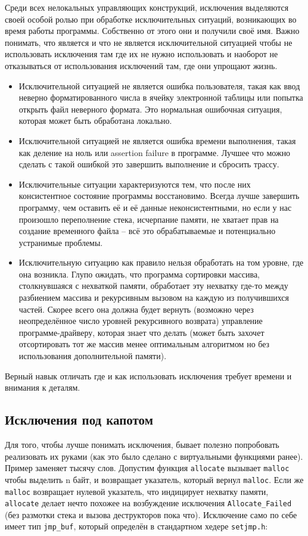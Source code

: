 \documentclass[a4paper,12pt,oneside]{article}
\begin{document}
Среди всех нелокальных управляющих конструкций, исключения выделяются своей особой ролью при обработке исключительных ситуаций, возникающих во время работы программы. Собственно от этого они и получили своё имя. Важно понимать, что является и что не является исключительной ситуацией чтобы не использовать исключения там где их не нужно использовать и наоборот не отказываться от использования исключений там, где они упрощают жизнь.

\begin{itemize}
\item
Исключительной ситуацией не является ошибка пользователя, такая как ввод неверно форматированного числа в ячейку электронной таблицы или попытка открыть файл неверного формата. Это нормальная ошибочная ситуация, которая может быть обработана локально.
\item
Исключительной ситуацией не является ошибка времени выполнения, такая как деление на ноль или assertion failure в программе. Лучшее что можно сделать с такой ошибкой это завершить выполнение и сбросить трассу.
\item
Исключительные ситуации характеризуются тем, что после них консистентное состояние программы восстановимо. Всегда лучше завершить программу, чем оставить её и её данные неконсистентными, но если у нас произошло переполнение стека, исчерпание памяти, не хватает прав на создание временного файла -- всё это обрабатываемые и потенциально устранимые проблемы.
\item
Исключительную ситуацию как правило нельзя обработать на том уровне, где она возникла. Глупо ожидать, что программа сортировки массива, столкнувшаяся с нехваткой памяти, обработает эту нехватку где-то между разбиением массива и рекурсивным вызовом на каждую из получившихся частей. Скорее всего она должна будет вернуть (возможно через неопределённое число уровней рекурсивного возврата) управление программе-драйверу, которая знает что делать (может быть захочет отсортировать тот же массив менее оптимальным алгоритмом но без использования дополнительной памяти).
\end{itemize}

Верный навык отличать где и как использовать исключения требует времени и внимания к деталям.

\subsection{Исключения под капотом}

Для того, чтобы лучше понимать исключения, бывает полезно попробовать реализовать их руками (как это было сделано с виртуальными функциями ранее). Пример заменяет тысячу слов. Допустим функция \lstinline!allocate! вызывает \lstinline!malloc! чтобы выделить n байт, и возвращает указатель, который вернул \lstinline!malloc!. Если же \lstinline!malloc! возвращает нулевой указатель, что индицирует нехватку памяти, \lstinline!allocate! делает нечто похожее на возбуждение исключения \lstinline!Allocate_Failed! (без размотки стека и вызова деструкторов пока что). Исключение само по себе имеет тип \lstinline!jmp_buf!, который определён в стандартном хедере \lstinline!setjmp.h!:
\end{document}
